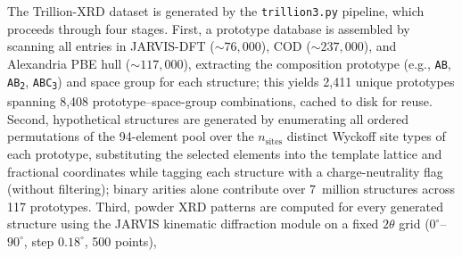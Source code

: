 \documentclass[pdflatex,sn-mathphys-num]{sn-jnl}
\theoremstyle{thmstyleone}
\theoremstyle{thmstyletwo}
\theoremstyle{thmstylethree}
\begin{document}
  The Trillion-XRD dataset is generated by the \texttt{trillion3.py} pipeline,                                                                                                    
  which proceeds through four stages. First, a prototype database is assembled by                                                                                                 
  scanning all entries in JARVIS-DFT (${\sim}76{,}000$), COD (${\sim}237{,}000$),                                                                                                 
  and Alexandria PBE hull (${\sim}117{,}000$), extracting the composition prototype                                                                                               
  (e.g., \texttt{AB}, \texttt{AB\textsubscript{2}}, \texttt{ABC\textsubscript{3}})                                                                                                
  and space group for each structure; this yields 2,411 unique prototypes spanning                                                                                                
  8,408 prototype--space-group combinations, cached to disk for reuse. Second,                                                                                                    
  hypothetical structures are generated by enumerating all ordered permutations of                                                                                                
  the 94-element pool over the $n_{\mathrm{sites}}$ distinct Wyckoff site types of                                                                                                
  each prototype, substituting the selected elements into the template lattice and                                                                                                
  fractional coordinates while tagging each structure with a charge-neutrality                                                                                                    
  flag (without filtering); binary arities alone contribute over 7~million                                                                                                        
  structures across 117 prototypes. Third, powder XRD patterns are computed for                                                                                                   
  every generated structure using the JARVIS kinematic diffraction module on a                                                                                                    
  fixed $2\theta$ grid ($0^\circ$--$90^\circ$, step $0.18^\circ$, 500 points),                                                                                                    
\end{document}
